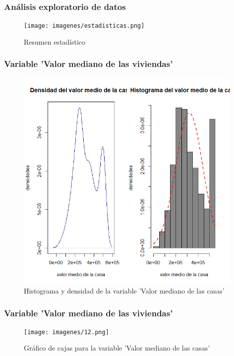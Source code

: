 \documentclass[12pt]{beamer}
\begin{document}
\begin{frame}
\frametitle{Análisis exploratorio de datos}
\begin{figure}[!h]
    \begin{center}
        \texttt{[image: imagenes/estadisticas.png]}
        \caption{Resumen estadístico}
        \label{fig:Densidad}
    \end{center}
\end{figure}

\end{frame}
\begin{frame}
\frametitle{Variable 'Valor mediano de las viviendas'}
\begin{figure}[!h]
    \begin{center}
        \includegraphics[width=11cm]{imagenes/1.png}
        \caption{Histograma y densidad de la variable 'Valor mediano de las casas'}
        \label{fig:Densidad}
    \end{center}
\end{figure}
\end{frame}
\begin{frame}
\frametitle{Variable 'Valor mediano de las viviendas'}
\begin{figure}[!h]
    \begin{center}
        \texttt{[image: imagenes/12.png]}
        \caption{Gráfico de cajas para la variable 'Valor mediano de las casas'}
        \label{fig:Densidad}
    \end{center}
\end{figure}
\end{frame}
\end{document}
